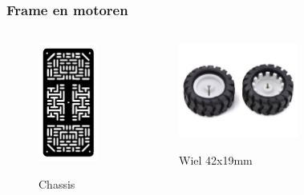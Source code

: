 \documentclass
   [kulak] %
   {kulakbeamer}
\begin{document}
\begin{frame}
	\frametitle{Frame en motoren} %
	
	\begin{columns}
		\begin{figure}
			\centering
			\includegraphics[width=.45\textwidth]{chassis}
			\caption{\scriptsize Chassis}\cite{RobotChassisRechthoekigZwart}
		\end{figure}
		\begin{figure}
			\centering
			\includegraphics[width=.7\textwidth]{wielen}
			\caption{\scriptsize Wiel 42x19mm}\cite{Wiel42x19mm}
		\end{figure}
		\begin{figure}

\end{figure}
\end{columns}
\end{frame}
\end{document}
